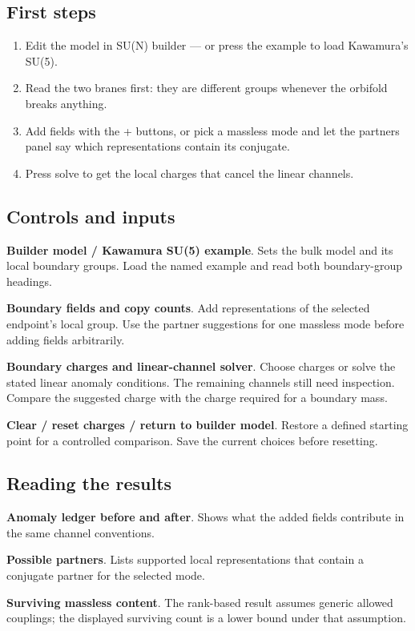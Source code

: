 \documentclass[11pt,a4paper]{article}
\begin{document}
\subsection*{First steps}
\begin{enumerate}
\item Edit the model in SU(N) builder --- or press the example to load Kawamura's SU(5).
\item Read the two branes first: they are different groups whenever the orbifold breaks anything.
\item Add fields with the + buttons, or pick a massless mode and let the partners panel say which representations contain its conjugate.
\item Press solve to get the local charges that cancel the linear channels.
\end{enumerate}
\subsection*{Controls and inputs}
\textbf{Builder model / Kawamura SU(5) example}. Sets the bulk model and its local boundary groups. Load the named example and read both boundary-group headings.

\textbf{Boundary fields and copy counts}. Add representations of the selected endpoint's local group. Use the partner suggestions for one massless mode before adding fields arbitrarily.

\textbf{Boundary charges and linear-channel solver}. Choose charges or solve the stated linear anomaly conditions. The remaining channels still need inspection. Compare the suggested charge with the charge required for a boundary mass.

\textbf{Clear / reset charges / return to builder model}. Restore a defined starting point for a controlled comparison. Save the current choices before resetting.

\subsection*{Reading the results}
\textbf{Anomaly ledger before and after}. Shows what the added fields contribute in the same channel conventions.

\textbf{Possible partners}. Lists supported local representations that contain a conjugate partner for the selected mode.

\textbf{Surviving massless content}. The rank-based result assumes generic allowed couplings; the displayed surviving count is a lower bound under that assumption.
\end{document}
